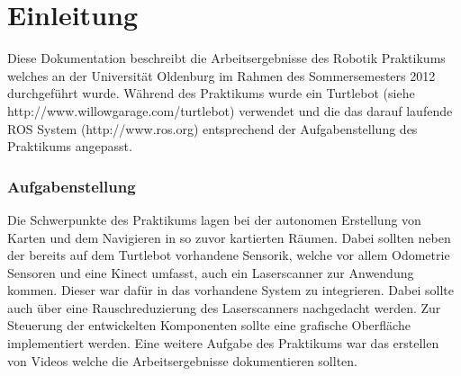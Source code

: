 \chapter{Einleitung}

Diese Dokumentation beschreibt die Arbeitsergebnisse des Robotik Praktikums welches an der Universität Oldenburg im Rahmen des Sommersemesters 2012 durchgeführt wurde. Während des Praktikums wurde ein Turtlebot (siehe http://www.willowgarage.com/turtlebot) verwendet und die das darauf laufende ROS System (http://www.ros.org) entsprechend der Aufgabenstellung des Praktikums angepasst.

\subsection{Aufgabenstellung}

Die Schwerpunkte des Praktikums lagen bei der autonomen Erstellung von Karten und dem Navigieren in so zuvor kartierten Räumen. Dabei sollten neben der bereits auf dem Turtlebot vorhandene Sensorik, welche vor allem Odometrie Sensoren und eine Kinect umfasst, auch ein Laserscanner zur Anwendung kommen. Dieser war dafür in das vorhandene System zu integrieren. Dabei sollte auch über eine Rauschreduzierung des Laserscanners nachgedacht werden. Zur Steuerung der entwickelten Komponenten sollte eine grafische Oberfläche implementiert werden.
Eine weitere Aufgabe des Praktikums war das erstellen von Videos welche die Arbeitsergebnisse dokumentieren sollten.